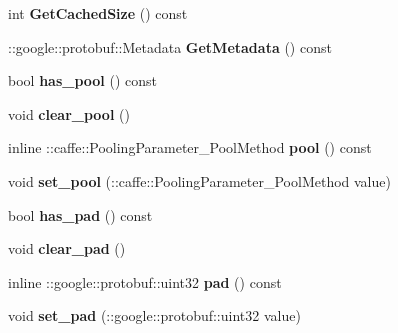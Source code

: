\begin{DoxyCompactItemize}
int {\bfseries Get\+Cached\+Size} () const
\item 
\mbox{\label{classcaffe_1_1_pooling_parameter_ac227c8ff918396adaab1f0a6e51fde83}} 
\+::google\+::protobuf\+::\+Metadata {\bfseries Get\+Metadata} () const
\item 
\mbox{\label{classcaffe_1_1_pooling_parameter_afdf5a64ddca87a11809f2a8d318a802b}} 
bool {\bfseries has\+\_\+pool} () const
\item 
\mbox{\label{classcaffe_1_1_pooling_parameter_a7d2f175982c27116179ca86fa4c7649f}} 
void {\bfseries clear\+\_\+pool} ()
\item 
\mbox{\label{classcaffe_1_1_pooling_parameter_a50123a0305d7a5b8f0035cc5dbbf6384}} 
inline \+::caffe\+::\+Pooling\+Parameter\+\_\+\+Pool\+Method {\bfseries pool} () const
\item 
\mbox{\label{classcaffe_1_1_pooling_parameter_a24358a91de5d15f45566c74e20416865}} 
void {\bfseries set\+\_\+pool} (\+::caffe\+::\+Pooling\+Parameter\+\_\+\+Pool\+Method value)
\item 
\mbox{\label{classcaffe_1_1_pooling_parameter_a2f2abe08edf022f35e2638a845be03c9}} 
bool {\bfseries has\+\_\+pad} () const
\item 
\mbox{\label{classcaffe_1_1_pooling_parameter_aa6ff174d344b3cad12e630d1fd313318}} 
void {\bfseries clear\+\_\+pad} ()
\item 
\mbox{\label{classcaffe_1_1_pooling_parameter_a508ff7d6ae14df981b5767ebfa16d3a1}} 
inline \+::google\+::protobuf\+::uint32 {\bfseries pad} () const
\item 
\mbox{\label{classcaffe_1_1_pooling_parameter_a4718852125664cd698d0380947602b60}} 
void {\bfseries set\+\_\+pad} (\+::google\+::protobuf\+::uint32 value)
\item 
\mbox{\label{classcaffe_1_1_pooling_parameter_a5cc1328ed8c527242b9f2123f6f06cc5}} 

\end{DoxyCompactItemize}
